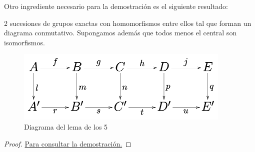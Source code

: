 \documentclass[palatino, bibnumbers]{apuntes}
\begin{document}
Otro ingrediente necesario para la demostración es el siguiente resultado:

\begin{lemma}
\label{lemma:delos5}
2 sucesiones de grupos exactas con homomorfismos entre ellos tal que forman un diagrama conmutativo. Supongamos además que todos menos el central son isomorfismos.
\end{lemma}

\begin{figure}[hbtp]
\centering
\includegraphics[scale=0.7]{img/lemadelos5.png}
\caption{Diagrama del lema de los 5}
\label{img:delos5}
\end{figure}

\begin{proof}
\href{https://es.wikipedia.org/wiki/Lema_de_los_cinco}{Para consultar la demostración.}
\end{proof}
\end{document}
